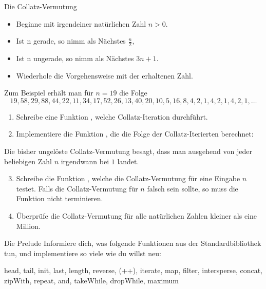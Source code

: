 \documentclass{uebblatt}
\begin{document}
\begin{aufgabe}{Die Collatz-Vermutung}
  \begin{itemize}
    \item Beginne mit irgendeiner natürlichen Zahl $n > 0$.
    \item Ist n gerade, so nimm als Nächstes $\tfrac{n}{2}$,
    \item Ist n ungerade, so nimm als Nächstes $3n + 1$.
    \item Wiederhole die Vorgehensweise mit der erhaltenen Zahl.
  \end{itemize}
  Zum Beispiel erhält man für $n=19$ die Folge
  \[ 19, 58, 29, 88, 44, 22, 11, 34, 17, 52, 26, 13, 40, 20, 10, 5, 16, 8, 4, 2, 1, 4, 2, 1, 4, 2, 1, \ldots \]
  \begin{enumerate}
    
    \item Schreibe eine Funktion , welche Collatz-Iteration durchführt.
    \item Implementiere die Funktion , die die Folge der Collatz-Iterierten berechnet: 
  \end{enumerate}
  Die bisher ungelöste Collatz-Vermutung besagt, dass man ausgehend von jeder beliebigen Zahl $n$ irgendwann bei $1$ landet.
  \begin{enumerate}
    \setcounter{enumi}{2}
    \item Schreibe die Funktion , welche die Collatz-Vermutung für eine Eingabe $n$ testet. Falls die Collatz-Vermutung für $n$ falsch sein sollte, so muss die Funktion nicht terminieren.
    \item Überprüfe die Collatz-Vermutung für alle natürlichen Zahlen kleiner als eine Million.
  \end{enumerate}
\end{aufgabe}

\begin{aufgabe}{Die Prelude}
  Informiere dich, was folgende Funktionen aus der Standardbibliothek tun, und implementiere so viele wie du willst neu:
  \begin{haskellcode}
head, tail, init, last, length, reverse, (++), iterate, map, filter,
intersperse, concat, zipWith, repeat, and, takeWhile, dropWhile, maximum
  \end{haskellcode}
\end{aufgabe}
\end{document}
